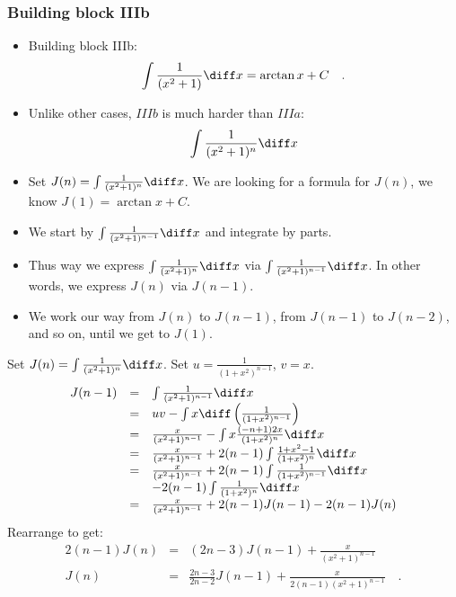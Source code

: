 
\begin{frame}
\frametitle{Building block IIIb}
\begin{itemize}
\item Building block IIIb: \[
\int \frac{1}{(x^2+1)}\diff x=\arctan x+C\quad .
\] 
\item Unlike other cases, $IIIb$ is much harder than $IIIa$:
\[\int \frac{1}{(x^2+1)^n}\diff x
\] 
\item Set $J(n)=\int \frac{1}{(x^2+1)^n}\diff x$. We are looking for a formula for $J(n)$, we know $J(1)=\arctan x+C$.
\item We start by $\int \frac{1}{(x^2+1)^{n-1}} \diff x$ and integrate by parts.
\item Thus way we express 
$\int \frac{1}{(x^2+1)^n} \diff x$ via $\int \frac{1}{(x^2+1)^{n-1}} \diff x$. In other words, we express $J(n)$ via $J(n-1)$.
\item We work our way from $J(n)$ to $J(n-1)$, from $J(n-1)$ to $J(n-2)$, and so on, until we get to $J(1)$.
\end{itemize} 
\end{frame}

\begin{frame}
\begin{example}
Set $J(n)=\int \frac{1}{(x^2+1)^{n}}\diff x$. Set $u=\frac{1}{(1+x^2)^{n-1}}$, $v=x$. 
\[
\begin{array}{rcl}
J(n-1)&=&\int  \frac{1}{(x^2+1)^{n-1 }}\diff x \\
&=& u v-\int  x \diff \left(\frac{1}{(1+x^2)^{n-1}}\right)\\
&=&\frac{x}{(x^2+1)^{n-1}}- \int x \frac{(-n+1)2x}{(1+x^2)^{n}}\diff x\\
&=&\frac{x}{(x^2+1)^{n-1}}+ 2(n-1)\int \frac{1+x^2-1}{(1+x^2)^n}\diff x\\
&=&\frac{x}{(x^2+1)^{n-1}}+ 2(n-1)\int \frac{1}{(1+x^2)^{n-1}}\diff x\\
&&-2(n-1)\int \frac{1}{(1+x^2)^n}\diff x\\
&=&\frac{x}{(x^2+1)^{n-1}}+2(n-1)J(n-1)-2(n-1)J(n)
\end{array}
\]
Rearrange to get:
\[
\begin{array}{rcl}
2(n-1)J(n)&=&(2n-3) J(n-1)+\frac{x}{(x^2+1)^{n-1}}\\
J(n)&=&\frac{2n-3}{2n-2}J(n-1) +\frac{x}{2 (n-1) (x^2+ 1)^{ n-1}}\quad .
\end{array}
\]
\end{example}

\end{frame}

